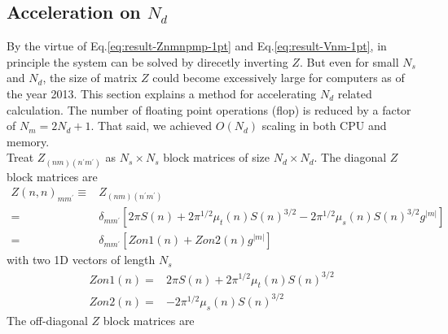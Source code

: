 \documentclass [10pt,letterpaper]{article}
\begin{document}
\subsection{Acceleration on $N_d$}
\label{sub:acceleration-on-Nd}
By the virtue of Eq.\eqref{eq:result-Znmnpmp-1pt} and Eq.\eqref{eq:result-Vnm-1pt}, in principle the system can be solved by direcetly inverting $Z$. 
But  even for small $N_s$ and $N_d$, the size of matrix $Z$ could become excessively large for computers as of the year 2013.  
This section explains a method for accelerating $N_d$ related calculation. 
The number of floating point operations (flop) is reduced by a factor of $N_m=2N_d+1$. 
That said, we achieved $O(N_d)$ scaling in both CPU and memory.
\\
Treat $Z_{(n m)(n^\prime m^\prime)}$ as $N_s\times N_s$ block matrices of size $N_d\times N_d$. The diagonal $Z$ block matrices are
\begin{equation} \label{eq:def-Znnp-diagonal}
	\begin{split}
		Z(n,n)_{m m^\prime}
		\equiv
		& 
		Z_{(n m)(n^\prime m^\prime)}
		\\
		=&
		\delta_{m m^\prime}
		[
			2\pi S(n)
			+
			2\pi^{1/2}
			\mu_t(n)
			S(n)^{3/2}
			-
			2\pi^{1/2}
			\mu_s(n)
			S(n)^{3/2}
			g^{\lvert m \rvert}
		]
		\\
		=&
		\delta_{m m^\prime}
		[
			Zon1(n)
			+
			Zon2(n)
			g^{\lvert m \rvert}
		]
	\end{split}
\end{equation}
with two 1D vectors of length $N_s$
\begin{subequations} \label{eq:def-Zon1-Zon2}
	\begin{align}
		Zon1(n)
		=&
		2\pi S(n)
		+
		2\pi^{1/2}
		\mu_t(n)
		S(n)^{3/2}
		\label{eq:def-Zon1}
		\\
		Zon2(n)
		=& 
		-
		2\pi^{1/2}
		\mu_s(n)
		S(n)^{3/2}
		\label{eq:def_Zon2}
	\end{align}
\end{subequations}
The off-diagonal $Z$ block matrices are
\end{document}
